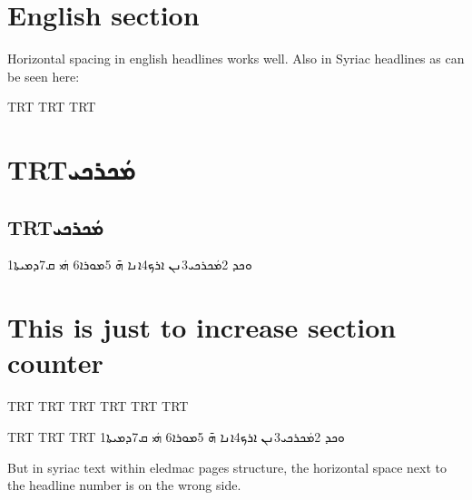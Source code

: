 \documentclass{scrartcl}
\newcommand{\textsyriac}[1] %
       {\bgroup\luatextextdir TRT\syriacfont #1\egroup}
\newenvironment{syriac}     %
       {\luatextextdir TRT%
       \luatexpardir TRT%
       \luatexbodydir TRT%
       \syriacfont}{}
\begin{document}
\section{English section} 

Horizontal spacing in english headlines works well. Also in Syriac headlines
as can be seen here: 

\begin{syriac}
    \section{\textsyriac{ܡܿܟܪܟܝ}}
    \subsection{\textsyriac{ܡܿܟܪܟܝ}}
    1ܘܟܕ 2ܡܿܟܪܟܝ3ܢܢ ܐܪܟ4ܐܢܐ ܗ̄ 5ܡܘܪܐ6 ܗܿܝ ܩ7ܕܡܝܬܐ
\end{syriac}

\section{This is just to increase section counter}

\begin{pages}
\begin{Leftside}
    \begin{syriac}
    \beginnumbering
    \pstart
            \begin{syriac}
            \eledsubsection{\textsyriac{ܡܿܟܪܟܝ}}
            \end{syriac}
    \pend

    \pstart
        \begin{syriac}
            1ܘܟܕ 2ܡܿܟܪܟܝ3ܢܢ ܐܪܟ4ܐܢܐ ܗ̄ 5ܡܘܪܐ6 ܗܿܝ ܩ7ܕܡܝܬܐ
        \end{syriac}
    \pend
    \endnumbering
    \end{syriac}
    \end{Leftside}

    \begin{Rightside}
    \beginnumbering
    \pstart
    \pend

    \pstart
        But in syriac text within eledmac pages structure, the
        horizontal space next to the headline number is on the wrong
        side. 
    \pend
    \endnumbering
    \end{Rightside}

    \Pages
    \end{pages} 
\end{document}
